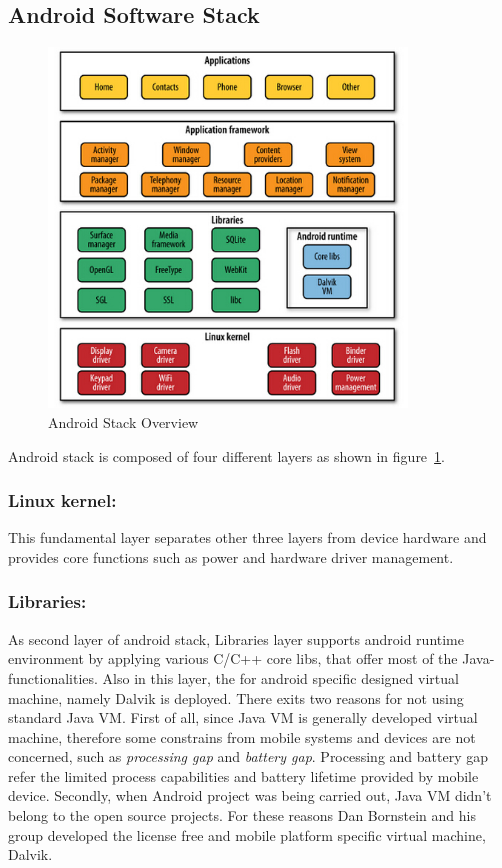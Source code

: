 \subsection{Android Software Stack}
\begin{figure}[!htbp]
	\centering
	\includegraphics[width=0.85\textwidth]{android-stack.jpg}
		\caption{Android Stack Overview \cite{learn_android}}
	\label{fig:android-stack}
\end{figure}
Android stack is composed of four different layers as shown in figure~\ref{fig:android-stack}.

\subsubsection{Linux kernel:}This fundamental layer separates other three layers  from  device hardware and provides core functions such as  power and hardware driver management.
\subsubsection{Libraries:}As second layer of android stack,  Libraries layer supports android runtime environment by applying various C/C++ core libs, that offer most of the Java-functionalities.  Also in this layer, the for android specific designed virtual machine, namely Dalvik\cite{learn_android} is deployed. There exits two reasons for not using standard Java VM\cite{learn_android}. First of all, since Java VM is generally developed virtual machine, therefore some constrains from mobile systems and devices are not concerned, such as \emph{processing gap} and \emph{battery gap}\cite{embedded_secure}. Processing and battery gap refer the limited process capabilities and battery lifetime provided by mobile device. Secondly, when Android project was being carried out, Java VM didn't  belong  to the open source projects. For these reasons Dan Bornstein and his group developed the license free and mobile platform specific virtual machine, Dalvik. 

